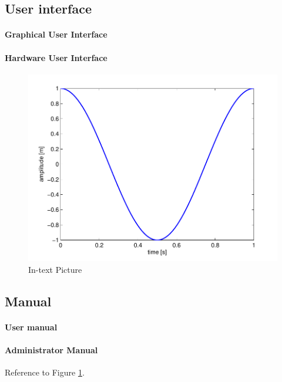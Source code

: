 \documentclass[fleqn,10pt]{SelfArx} %
\begin{document}
\subsection{User interface}
\lipsum[3]
\paragraph{Graphical User Interface}
\lipsum[2]
\paragraph{Hardware User Interface}
\lipsum[1]

\begin{figure}[ht]\centering
\includegraphics[width=\linewidth]{results}
\caption{In-text Picture}
\label{fig:results}
\end{figure}

\subsection{Manual}
\lipsum[2]
\paragraph{User manual}
\lipsum[4]
\paragraph{Administrator Manual}
\lipsum[6]
Reference to Figure \ref{fig:results}.

\end{document}
